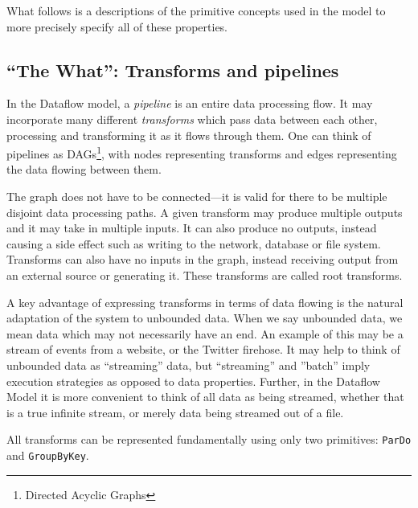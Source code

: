 What follows is a descriptions of the primitive concepts used in the model to more precisely specify all of these properties.

\subsection{``The What'': Transforms and pipelines}\label{sec:prep:dataflow:what}

In the Dataflow model, a \emph{pipeline} is an entire data processing flow.
It may incorporate many different \emph{transforms} which pass data between each other, processing and transforming it as it flows through them.
One can think of pipelines as DAGs\footnote{Directed Acyclic Graphs}, with nodes representing transforms and edges representing the data flowing between them.


The graph does not have to be connected---it is valid for there to be multiple disjoint data processing paths.
A given transform may produce multiple outputs and it may take in multiple inputs.
It can also produce no outputs, instead causing a side effect such as writing to the network, database or file system.
Transforms can also have no inputs in the graph, instead receiving output from an external source or generating it.
These transforms are called root transforms.

A key advantage of expressing transforms in terms of data flowing is the natural adaptation of the system to unbounded data.
When we say unbounded data, we mean data which may not necessarily have an end.
An example of this may be a stream of events from a website, or the Twitter firehose.
It may help to think of unbounded data as ``streaming'' data, but ``streaming'' and ''batch'' imply execution strategies as opposed to data properties.
Further, in the Dataflow Model it is more convenient to think of all data as being streamed, whether that is a true infinite stream, or merely data being streamed out of a file.

All transforms can be represented fundamentally using only two primitives: \verb|ParDo| and \verb|GroupByKey|\footnotemark[2].


